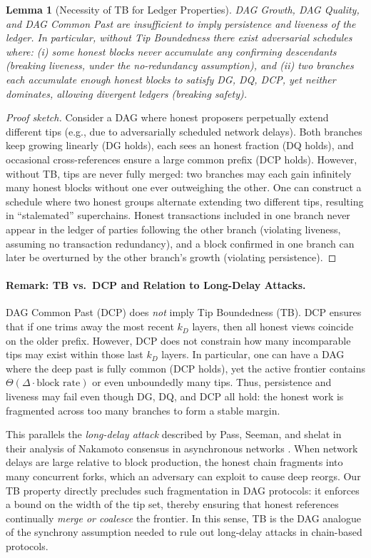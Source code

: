 \documentclass[11pt]{article}
\newtheorem{lemma}[theorem]{Lemma}
\begin{document}
\begin{lemma}[Necessity of TB for Ledger Properties]
DAG Growth, DAG Quality, and DAG Common Past are insufficient to imply persistence
and liveness of the ledger. In particular, without Tip Boundedness there exist
adversarial schedules where: (i) some honest blocks never accumulate any confirming
descendants (breaking liveness, under the no-redundancy assumption), and (ii) two
branches each accumulate enough honest blocks to satisfy DG, DQ, DCP, yet neither
dominates, allowing divergent ledgers (breaking safety).
\end{lemma}

\begin{proof}[Proof sketch]
Consider a DAG where honest proposers perpetually extend different tips (e.g., due
to adversarially scheduled network delays). Both branches keep growing linearly
(DG holds), each sees an honest fraction (DQ holds), and occasional cross-references
ensure a large common prefix (DCP holds). However, without TB, tips are never fully
merged: two branches may each gain infinitely many honest blocks without one ever
outweighing the other. One can construct a schedule where two honest groups alternate
extending two different tips, resulting in ``stalemated'' superchains. Honest
transactions included in one branch never appear in the ledger of parties following
the other branch (violating liveness, assuming no transaction redundancy), and a
block confirmed in one branch can later be overturned by the other branch’s growth
(violating persistence).
\end{proof}

\paragraph{Remark: TB vs.\ DCP and Relation to Long-Delay Attacks.}
DAG Common Past (DCP) does \emph{not} imply Tip Boundedness (TB). DCP ensures that if one trims away the most recent $k_D$ layers, then all honest views coincide on the older prefix. However, DCP does not constrain how many incomparable tips may exist within those last $k_D$ layers. In particular, one can have a DAG where the deep past is fully common (DCP holds), yet the active frontier contains $\Theta(\Delta \cdot \text{block rate})$ or even unboundedly many tips. Thus, persistence and liveness may fail even though DG, DQ, and DCP all hold: the honest work is fragmented across too many branches to form a stable margin.

This parallels the \emph{long-delay attack} described by Pass, Seeman, and shelat in their analysis of Nakamoto consensus in asynchronous networks \cite[Section~8]{EC:PasSeeShe17}. When network delays are large relative to block production, the honest chain fragments into many concurrent forks, which an adversary can exploit to cause deep reorgs. Our TB property directly precludes such fragmentation in DAG protocols: it enforces a bound on the width of the tip set, thereby ensuring that honest references continually \emph{merge or coalesce} the frontier. In this sense, TB is the DAG analogue of the synchrony assumption needed to rule out long-delay attacks in chain-based protocols.
\end{document}
